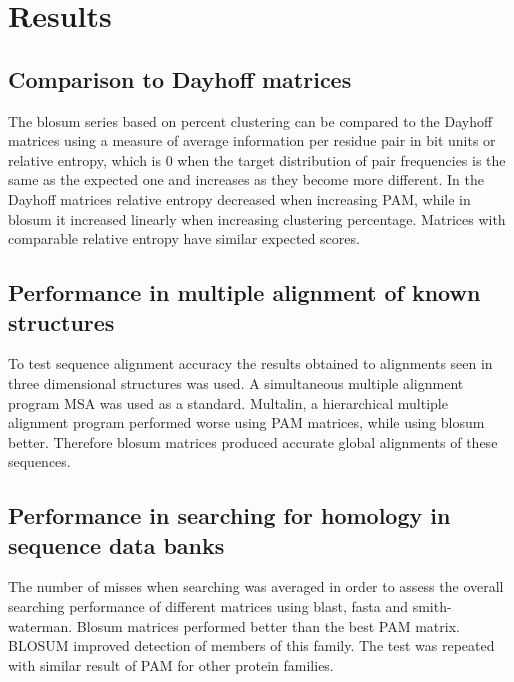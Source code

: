 \section{Results}

	\subsection{Comparison to Dayhoff matrices}
	The blosum series based on percent clustering can be compared to the Dayhoff matrices using a measure of average information per residue pair in bit units or relative entropy, which is $0$ when the target distribution of pair frequencies is the same as the expected one and increases as they become more different.
	In the Dayhoff matrices relative entropy decreased when increasing PAM, while in blosum it increased linearly when increasing clustering percentage.
	Matrices with comparable relative entropy have similar expected scores.

	\subsection{Performance in multiple alignment of known structures}
	To test sequence alignment accuracy the results obtained to alignments seen in three dimensional structures was used.
	A simultaneous multiple alignment program MSA was used as a standard.
	Multalin, a hierarchical multiple alignment program performed worse using PAM matrices, while using blosum better.
	Therefore blosum matrices produced accurate global alignments of these sequences.

	\subsection{Performance in searching for homology in sequence data banks}
	The number of misses when searching was averaged in order to assess the overall searching performance of different matrices using blast, fasta and smith-waterman.
	Blosum matrices performed better than the best PAM matrix.
	BLOSUM improved detection of members of this family.
	The test was repeated with similar result of PAM for other protein families.
